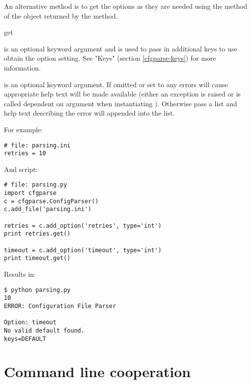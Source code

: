 \documentclass{howto}
\begin{document}
An alternative method is to get the options as they are needed using the
 method of the object returned by the  method.

  \begin{funcdesc}{get}{}

     is an optional keyword argument and is used to pass in 
        additional keys to use obtain the option setting.  
        See "Keys" (section \ref{cfgparse-keys}) for more information.
    
     is an optional keyword argument.  If omitted or set to
         any errors will cause appropriate help text will be 
        made available (either an exception is raised or 
         is called dependent on  
        argument when instantiating ).  Otherwise 
        pass a list and help text describing the error will appended 
        into the list.
  \end{funcdesc}

For example:

\begin{verbatim}
# file: parsing.ini
retries = 10
\end{verbatim}

And script:

\begin{verbatim}
# file: parsing.py
import cfgparse
c = cfgparse.ConfigParser()
c.add_file('parsing.ini')

retries = c.add_option('retries', type='int')
print retries.get()

timeout = c.add_option('timeout', type='int')
print timeout.get()
\end{verbatim}

Results in:

\begin{verbatim}
$ python parsing.py
10
ERROR: Configuration File Parser

Option: timeout
No valid default found.
keys=DEFAULT
\end{verbatim}
  
\section{Command line cooperation\label{cfgparse-cmd-line-coop}}
\end{document}
